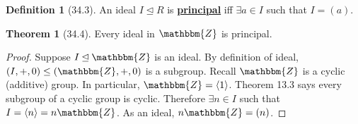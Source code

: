 \documentclass{article}
\newcommand{\Z}{\mathbbm{Z}}
\newcommand{\define}[1]{\textbf{\underline{#1}}}
\theoremstyle{definition}
\newtheorem*{defn}{Definition}
\newtheorem*{thm}{Theorem}
\theoremstyle{remark}
\newcommand{\cyc}[1]{\langle#1\rangle}
\newcommand{\ideal}{\unlhd}
\begin{document}
{{            \begin{defn}[34.3]
                An ideal $I \ideal R$ is \define{principal} iff $\exists a \in I$ such that $I=(a)$.
            \end{defn}
            
            \begin{thm}[34.4]
                Every ideal in $\Z$ is principal.
            \end{thm}
            
            \begin{proof}
                Suppose $I\ideal \Z$ is an ideal. By definition of ideal, $(I,+,0) \leq (\Z,+,0)$ is a subgroup. Recall $\Z$ is a cyclic (additive) group. In particular, $\Z=\cyc{1}$. Theorem 13.3 says every subgroup of a cyclic group is cyclic. Therefore $\exists n\in I$ such that $I=\cyc{n}=n\Z$. As an ideal, $n\Z=(n)$.
            \end{proof}
        }
    }
\end{document}
